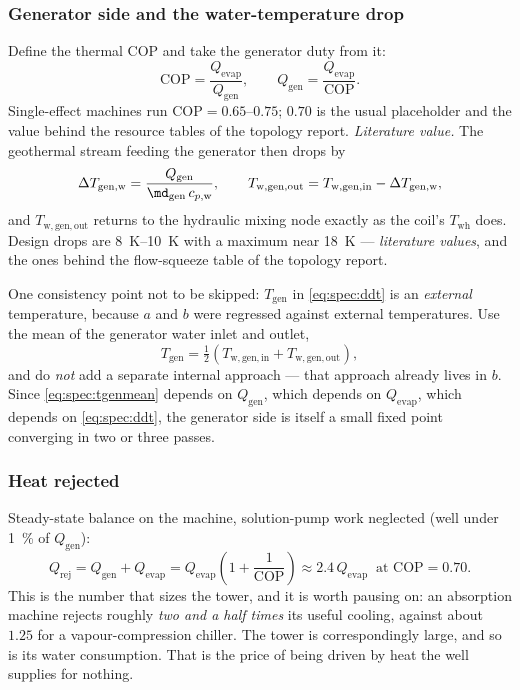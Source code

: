 \subsubsection{Generator side and the water-temperature drop}
Define the thermal COP and take the generator duty from it:
\begin{equation}
\mathrm{COP} = \frac{Q_{\mathrm{evap}}}{Q_{\mathrm{gen}}} ,
\qquad
Q_{\mathrm{gen}} = \frac{Q_{\mathrm{evap}}}{\mathrm{COP}} .
\label{eq:spec:qgen}
\end{equation}
Single-effect machines run $\mathrm{COP}=\numrange{0.65}{0.75}$; $0.70$ is the usual placeholder and
the value behind the resource tables of the topology report. \emph{Literature value.} The geothermal
stream feeding the generator then drops by
\begin{equation}
\Delta T_{\mathrm{gen,w}} = \frac{Q_{\mathrm{gen}}}{\md_{\mathrm{gen}}\,c_{p,\mathrm{w}}} ,
\qquad
T_{\mathrm{w,gen,out}} = T_{\mathrm{w,gen,in}} - \Delta T_{\mathrm{gen,w}} ,
\label{eq:spec:dtgen}
\end{equation}
and $T_{\mathrm{w,gen,out}}$ returns to the hydraulic mixing node exactly as the coil's
$T_{\mathrm{wh}}$ does. Design drops are \SIrange{8}{10}{\kelvin} with a maximum near
\SI{18}{\kelvin} --- \emph{literature values}, and the ones behind the flow-squeeze table of the
topology report.

One consistency point not to be skipped: $T_{\mathrm{gen}}$ in \eqref{eq:spec:ddt} is an
\emph{external} temperature, because $a$ and $b$ were regressed against external temperatures. Use
the mean of the generator water inlet and outlet,
\begin{equation}
T_{\mathrm{gen}} = \tfrac{1}{2}\left(T_{\mathrm{w,gen,in}} + T_{\mathrm{w,gen,out}}\right) ,
\label{eq:spec:tgenmean}
\end{equation}
and do \emph{not} add a separate internal approach --- that approach already lives in $b$. Since
\eqref{eq:spec:tgenmean} depends on $Q_{\mathrm{gen}}$, which depends on $Q_{\mathrm{evap}}$, which
depends on \eqref{eq:spec:ddt}, the generator side is itself a small fixed point converging in two or
three passes.

\subsubsection{Heat rejected}
Steady-state balance on the machine, solution-pump work neglected (well under \SI{1}{\percent} of
$Q_{\mathrm{gen}}$):
\begin{equation}
Q_{\mathrm{rej}} = Q_{\mathrm{gen}} + Q_{\mathrm{evap}}
 = Q_{\mathrm{evap}}\left(1+\frac{1}{\mathrm{COP}}\right)
 \approx 2.4\,Q_{\mathrm{evap}} \ \text{ at } \mathrm{COP}=0.70 .
\label{eq:spec:qrej}
\end{equation}
This is the number that sizes the tower, and it is worth pausing on: an absorption machine rejects
roughly \emph{two and a half times} its useful cooling, against about $1.25$ for a
vapour-compression chiller. The tower is correspondingly large, and so is its water consumption. That
is the price of being driven by heat the well supplies for nothing.

